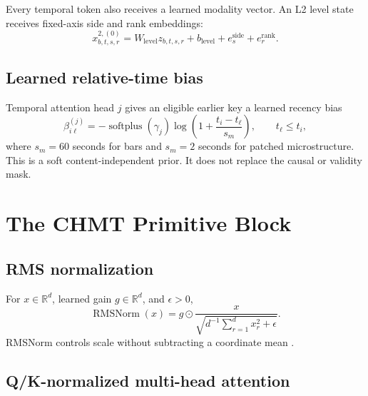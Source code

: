 \documentclass[10pt,letterpaper]{article}
\numberwithin{equation}{section}
\newcommand{\R}{\mathbb{R}}
\newcommand{\softplus}{\operatorname{softplus}}
\newcommand{\RMSNorm}{\operatorname{RMSNorm}}
\theoremstyle{definition}
\theoremstyle{remark}
\begin{document}
Every temporal token also receives a learned modality vector. An L2 level
state receives fixed-axis side and rank embeddings:
\begin{equation}
x_{b,t,s,r}^{2,(0)}=
W_{\mathrm{level}}z_{b,t,s,r}+b_{\mathrm{level}}
+e_s^{\mathrm{side}}+e_r^{\mathrm{rank}}.
\label{eq:l2-projection}
\end{equation}

\subsection{Learned relative-time bias}

Temporal attention head $j$ gives an eligible earlier key a learned recency
bias
\begin{equation}
\beta_{i\ell}^{(j)}=-\softplus(\gamma_j)
\log\!\left(1+\frac{t_i-t_\ell}{s_m}\right),
\qquad t_\ell\le t_i,
\label{eq:relative-time-bias}
\end{equation}
where $s_m=60$ seconds for bars and $s_m=2$ seconds for patched
microstructure. This is a soft content-independent prior. It does not replace
the causal or validity mask.

\section{The CHMT Primitive Block}

\subsection{RMS normalization}

For $x\in\R^d$, learned gain $g\in\R^d$, and $\epsilon>0$,
\begin{equation}
\RMSNorm(x)=g\odot
\frac{x}{\sqrt{d^{-1}\sum_{r=1}^{d}x_r^2+\epsilon}}.
\label{eq:rmsnorm}
\end{equation}
RMSNorm controls scale without subtracting a coordinate mean
\citep{zhang2019rms}.

\subsection{Q/K-normalized multi-head attention}
\end{document}
